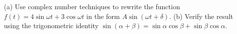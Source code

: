         (a) Use complex number techniques to
        rewrite the function $f(t)=4\sin\omega t+3\cos\omega t$ 
        in the form $A\sin(\omega t+\delta)$.\answercheck\hwendpart
        (b) Verify the result using the trigonometric
        identity $\sin(\alpha+\beta)=\sin\alpha\cos\beta+\sin\beta\cos\alpha$.
